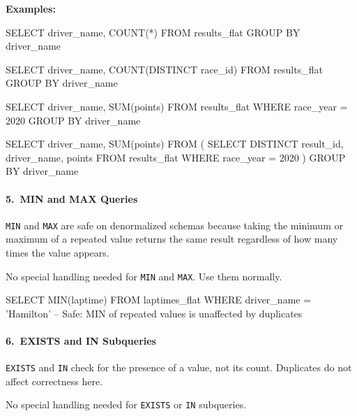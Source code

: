 \begin{tcolorbox}[
  colback=gray!5,
  colframe=gray!20,
  arc=4pt,
  boxrule=0.5pt,
  breakable,
  left=8pt,
  right=8pt,
  top=8pt,
  bottom=8pt,
  nobeforeafter,
]
\noindent\textbf{Examples:}

\begin{sqlwrong}
SELECT driver_name, COUNT(*) FROM results_flat GROUP BY driver_name
\end{sqlwrong}
\begin{sqlcorrect}
SELECT driver_name, COUNT(DISTINCT race_id)
FROM results_flat
GROUP BY driver_name
\end{sqlcorrect}

\begin{sqlwrong}
SELECT driver_name, SUM(points) FROM results_flat
  WHERE race_year = 2020
GROUP BY driver_name
\end{sqlwrong}
\begin{sqlcorrect}
SELECT driver_name, SUM(points) FROM (
  SELECT DISTINCT result_id, driver_name, points
  FROM results_flat
  WHERE race_year = 2020
) GROUP BY driver_name
\end{sqlcorrect}

\tcbline
\paragraph{5.\ MIN and MAX Queries}
\texttt{MIN} and \texttt{MAX} are safe on denormalized schemas because taking the minimum or maximum of a repeated value returns the same result regardless of how many times the value appears.

\denormrule No special handling needed for \texttt{MIN} and \texttt{MAX}. Use them normally.

\begin{sqlcorrect}
SELECT MIN(laptime) FROM laptimes_flat
  WHERE driver_name = 'Hamilton'
  -- Safe: MIN of repeated values is unaffected by duplicates
\end{sqlcorrect}

\tcbline
\paragraph{6.\ EXISTS and IN Subqueries}
\texttt{EXISTS} and \texttt{IN} check for the presence of a value, not its count.
Duplicates do not affect correctness here.

\denormrule No special handling needed for \texttt{EXISTS} or \texttt{IN} subqueries.

\tcbline

\end{tcolorbox}

